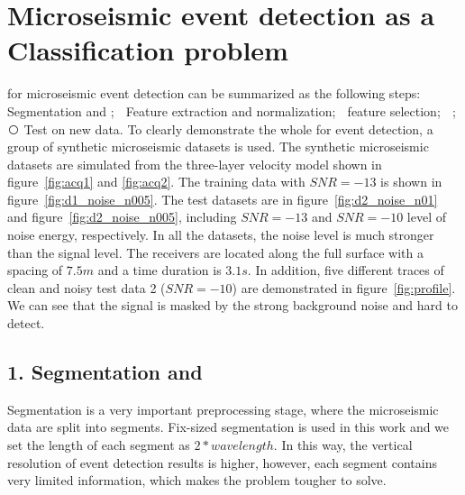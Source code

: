 \section{Microseismic event detection as a Classification problem}
 for microseismic event detection can be summarized as the following steps: \textcircled{\raisebox{-0.9pt}{1}} Segmentation and ; \textcircled{\raisebox{-0.9pt}{2}} Feature extraction and normalization; \textcircled{\raisebox{-0.9pt}{3}} feature selection; \textcircled{\raisebox{-0.9pt}{4}} ; \textcircled{\raisebox{-0.9pt}{5}} Test on new data. To clearly demonstrate the whole  for event detection, a group of synthetic microseismic datasets is used. The synthetic microseismic datasets are simulated from the three-layer velocity model shown in figure~\ref{fig:acq1} and \ref{fig:acq2}. The  training data with $SNR=-13$ is shown in figure~\ref{fig:d1_noise_n005}. The  test datasets are in figure~\ref{fig:d2_noise_n01} and figure~\ref{fig:d2_noise_n005}, including $SNR=-13$ and $SNR=-10$ level of noise energy, respectively.  In all the datasets, the noise level is much stronger than the signal level. The receivers are located along the full surface with a spacing of $7.5m$ and a time duration is $3.1s$. In addition, five different traces of clean and noisy test data 2 ($SNR=-10$) are demonstrated in figure~\ref{fig:profile}. We can see that the signal is masked by the strong background noise and hard to detect.

\subsection{1. Segmentation and }
Segmentation is a very important preprocessing stage, where the microseismic data are split into segments. Fix-sized segmentation is used in this work and we set the length of each segment as $2*wavelength$. In this way, the vertical resolution of event detection results is higher, however, each segment contains very limited information, which makes the problem tougher to solve.

